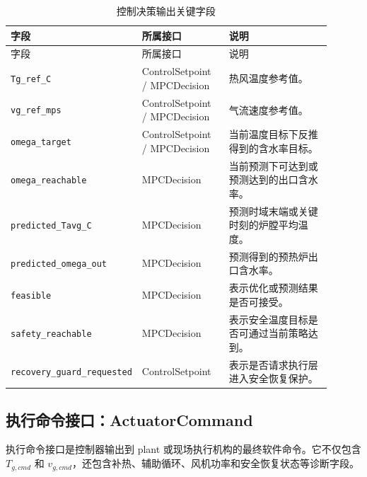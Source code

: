 \documentclass[UTF8,openany,zihao=-4,oneside]{ctexbook}
\begin{document}
\begin{longtable}{@{}p{0.22\linewidth}p{0.28\linewidth}p{0.40\linewidth}@{}}
\caption{控制决策输出关键字段}\label{tab:control-output}\\
\toprule
字段 & 所属接口 & 说明 \\
\midrule
\endfirsthead
\toprule
字段 & 所属接口 & 说明 \\
\midrule
\endhead
\texttt{Tg\_ref\_C} & ControlSetpoint / MPCDecision & 热风温度参考值。 \\
\texttt{vg\_ref\_mps} & ControlSetpoint / MPCDecision & 气流速度参考值。 \\
\texttt{omega\_target} & ControlSetpoint / MPCDecision & 当前温度目标下反推得到的含水率目标。 \\
\texttt{omega\_reachable} & MPCDecision & 当前预测下可达到或预测达到的出口含水率。 \\
\texttt{predicted\_Tavg\_C} & MPCDecision & 预测时域末端或关键时刻的炉膛平均温度。 \\
\texttt{predicted\_omega\_out} & MPCDecision & 预测得到的预热炉出口含水率。 \\
\texttt{feasible} & MPCDecision & 表示优化或预测结果是否可接受。 \\
\texttt{safety\_reachable} & MPCDecision & 表示安全温度目标是否可通过当前策略达到。 \\
\texttt{recovery\_guard\_requested} & ControlSetpoint & 表示是否请求执行层进入安全恢复保护。 \\
\bottomrule
\end{longtable}

\subsection{执行命令接口：ActuatorCommand}\label{subsec:actuatorcommand}

执行命令接口是控制器输出到 plant 或现场执行机构的最终软件命令。它不仅包含 \(T_{g,cmd}\) 和 \(v_{g,cmd}\)，还包含补热、辅助循环、风机功率和安全恢复状态等诊断字段。
\end{document}
